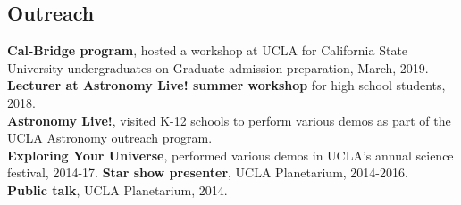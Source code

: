 \documentclass[margin, line]{res}
\begin{document}
\begin{resume}

%

%
%
%


\section{\sc Outreach}
{\bf Cal-Bridge program}, hosted a workshop at UCLA for California State University undergraduates on Graduate admission preparation, March, 2019. \\
{\bf Lecturer at Astronomy Live! summer workshop} for high school students, 2018. \\
{\bf Astronomy Live!}, visited K-12 schools to perform various demos as part of the UCLA Astronomy outreach program. \\
{\bf Exploring Your Universe}, performed various demos in UCLA's annual science festival, 2014-17.
{\bf Star show presenter}, UCLA Planetarium, 2014-2016. \\
{\bf Public talk}, UCLA Planetarium, 2014. \\



\end{resume}
\end{document}
